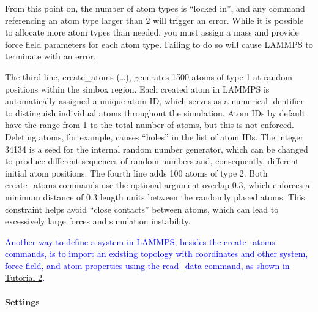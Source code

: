 \documentclass[9pt,tutorial]{livecoms}
\newcommand{\lmpcmd}[1]{\hspace{0pt}\colorbox{listing}{\textcolor{command}{\small{#1}}}\hspace{0pt}} %
\begin{document}
\begin{note}
  From this point on, {\color{blue} the number of atom types is ``locked
    in'', and} any command referencing an atom type larger than 2 will
  trigger an error.  While it is possible to allocate more atom types
  than needed, you must assign a mass and provide force field parameters
  for each atom type.  Failing to do so will cause LAMMPS to terminate
  with an error.
\end{note}

The third line, \lmpcmd{create\_atoms (\dots)}, generates 1500 atoms of
type 1 at random positions within the \lmpcmd{simbox} region.
{\color{blue}Each created atom in LAMMPS is automatically assigned a
  unique atom ID, which serves as a numerical identifier to distinguish
  individual atoms throughout the simulation.  Atom IDs by default have
  the range from 1 to the total number of atoms, but this is not
  enforced.  Deleting atoms, for example, causes ``holes'' in the list
  of atom IDs.} The integer 34134 is a seed for the internal random
number generator, which can be changed to produce different sequences of
random numbers and, consequently, different initial atom positions.  The
fourth line adds 100 atoms of type 2.  Both \lmpcmd{create\_atoms}
commands use the optional argument \lmpcmd{overlap 0.3}, which enforces
a minimum distance of 0.3 {\color{blue}length} units between the
randomly placed atoms.  This constraint helps avoid ``close contacts''
between atoms, which can lead to excessively large forces and simulation
instability.

\begin{note}
  \textcolor{blue}{Another way to define a system in LAMMPS, besides the
    \lmpcmd{create\_atoms} commands, is to import an existing topology
    with coordinates and other system, force field, and atom properties
    using the \lmpcmd{read\_data} command, as shown in
    \hyperref[carbon-nanotube-label]{Tutorial 2}.}
\end{note}

\paragraph{Settings}
\end{document}
